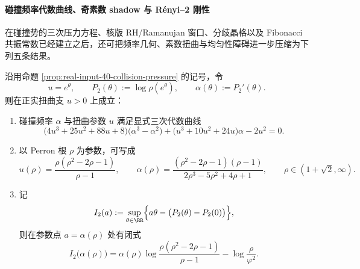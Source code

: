\paragraph{碰撞频率代数曲线、奇素数 shadow 与 Rényi--2 刚性}
在碰撞势的三次压力方程、核版 RH/Ramanujan 窗口、分歧晶格以及 Fibonacci 共振常数已经建立之后，还可把频率几何、素数扭曲与均匀性障碍进一步压缩为下列五条结果。

\begin{theorem}[碰撞频率的代数曲线与精确大偏差参数化]\label{thm:xi-time-part9p-collision-frequency-algebraic-ldp}
沿用命题 \ref{prop:real-input-40-collision-pressure} 的记号，令
\[
u=e^\theta,\qquad
P_2(\theta):=\log \rho(e^\theta),\qquad
\alpha(\theta):=P_2'(\theta).
\]
则在正实扭曲支 \(u>0\) 上成立：
\begin{enumerate}
  \item 碰撞频率 \(\alpha\) 与扭曲参数 \(u\) 满足显式三次代数曲线
  \begin{equation}\label{eq:xi-time-part9p-collision-frequency-algebraic-curve}
  \bigl(4u^3+25u^2+88u+8\bigr)\bigl(\alpha^3-\alpha^2\bigr)
  +\bigl(u^3+10u^2+24u\bigr)\alpha-2u^2=0.
  \end{equation}
  \item 以 Perron 根 \(\rho\) 为参数，可写成
  \begin{equation}\label{eq:xi-time-part9p-collision-frequency-rho-param}
  u(\rho)=\frac{\rho(\rho^2-2\rho-1)}{\rho-1},
  \qquad
  \alpha(\rho)=\frac{(\rho^2-2\rho-1)(\rho-1)}{2\rho^3-5\rho^2+4\rho+1},
  \qquad \rho\in(1+\sqrt2,\infty).
  \end{equation}
  \item 记
  \[
  I_2(a):=\sup_{\theta\in\RR}\Bigl\{a\theta-\bigl(P_2(\theta)-P_2(0)\bigr)\Bigr\},
  \]
  则在参数点 \(a=\alpha(\rho)\) 处有闭式
  \begin{equation}\label{eq:xi-time-part9p-collision-frequency-rate-param}
  I_2\bigl(\alpha(\rho)\bigr)
  =
  \alpha(\rho)\log\!\frac{\rho(\rho^2-2\rho-1)}{\rho-1}
  -\log\!\frac{\rho}{\varphi^2}.
  \end{equation}
\end{enumerate}
\end{theorem}
